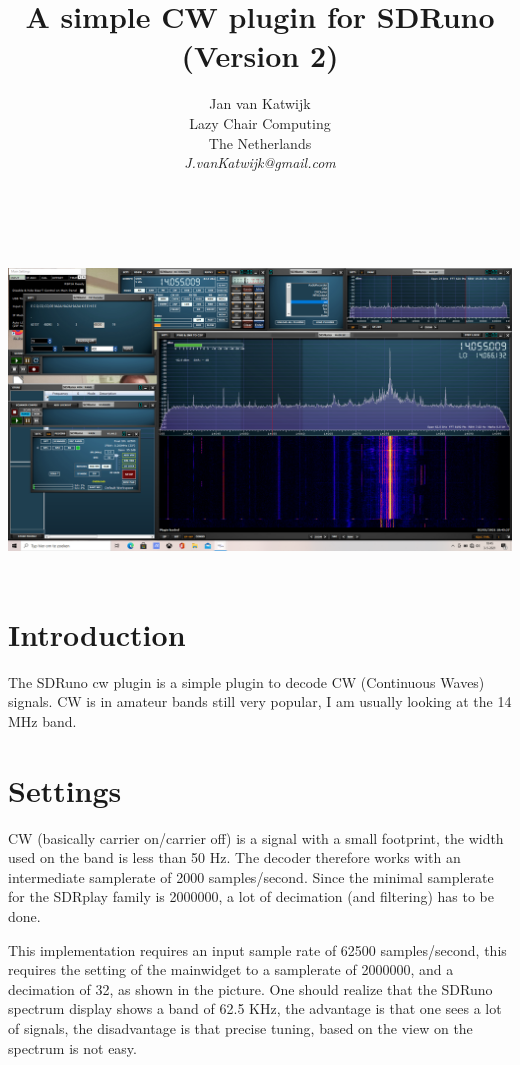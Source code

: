 \documentclass[11pt]{article}
\begin{document}
\title{A simple CW plugin for SDRuno (Version 2)}
\author{
Jan van Katwijk\\
Lazy Chair Computing \\
The Netherlands\\
{\em J.vanKatwijk@gmail.com}}
\maketitle
\ \\
\ \\
\includegraphics[width=140mm]{cw-example.png}
\ \\
\section{Introduction}
The SDRuno cw plugin is a simple plugin to decode CW (Continuous Waves) signals.
CW is in amateur bands still very popular, I am usually looking at the
14 MHz band. 

\section{Settings}
CW (basically carrier on/carrier off) is a signal with a small footprint,
the width used on  the band is less than 50 Hz.
The decoder therefore works with an intermediate
samplerate of 2000 samples/second. Since the minimal samplerate for the
SDRplay family is 2000000, a lot of decimation (and filtering) has to be done.
\par
This implementation requires an input sample rate of 62500 samples/second,
this requires the setting of the mainwidget to a samplerate of 2000000,
and a decimation of 32, as shown in the picture.
One should realize that the SDRuno spectrum display shows a band of 62.5
KHz, the advantage is that one sees a lot of signals, the disadvantage
is that precise tuning, based on the view on the spectrum is not easy.
\end{document}
